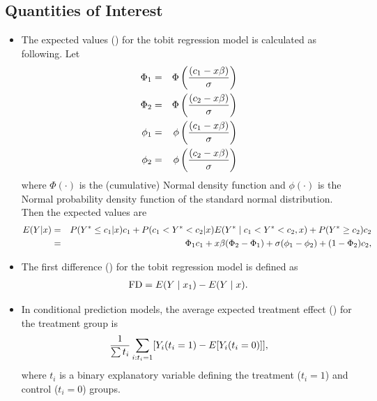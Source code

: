 \documentclass[letterpaper,10pt,english]{sphinxmanual}
\begin{document}
\subsection{Quantities of Interest}
\label{vignette:id124}\begin{itemize}
\item {} 
The expected values () for the tobit regression model is
calculated as following. Let
\begin{gather}
\begin{split}\begin{aligned}
\Phi_1 &=& \Phi\left(\frac{(c_1 - x \beta)}{\sigma}\right) \\
\Phi_2 &=& \Phi\left(\frac{(c_2 - x \beta)}{\sigma}\right) \\
\phi_1 &=& \phi\left(\frac{(c_1 - x \beta)}{\sigma}\right) \\
\phi_2 &=& \phi\left(\frac{(c_2 - x \beta)}{\sigma}\right) \end{aligned}\end{split}\notag
\end{gather}
where \(\Phi(\cdot)\) is the (cumulative) Normal density function
and \(\phi(\cdot)\) is the Normal probability density function of
the standard normal distribution. Then the expected values are
\begin{gather}
\begin{split}\begin{aligned}
E(Y|x) &=& P(Y^* \le c_1|x) c_1+P(c_1<Y^*<c_2|x) E(Y^* \mid c_1<Y^*<c_2, x)+P(Y^* \ge c_2) c_2 \\
   &=& \Phi_{1}c_1 + x \beta(\Phi_{2}-\Phi_{1}) + \sigma (\phi_1 -\phi_2) + (1-\Phi_2) c_2,\end{aligned}\end{split}\notag
\end{gather}
\item {} 
The first difference () for the tobit regression model is
defined as
\begin{gather}
\begin{split}\begin{aligned}
\text{FD}=E(Y\mid x_{1})-E(Y\mid x).\end{aligned}\end{split}\notag
\end{gather}
\item {} 
In conditional prediction models, the average expected treatment
effect () for the treatment group is
\begin{gather}
\begin{split}\begin{aligned}
\frac{1}{\sum t_{i}}\sum_{i:t_{i}=1}[Y_{i}(t_{i}=1)-E[Y_{i}(t_{i}=0)]],\end{aligned}\end{split}\notag
\end{gather}
where \(t_{i}\) is a binary explanatory variable defining the
treatment (\(t_{i}=1\)) and control (\(t_{i}=0\)) groups.

\end{itemize}
\end{document}
